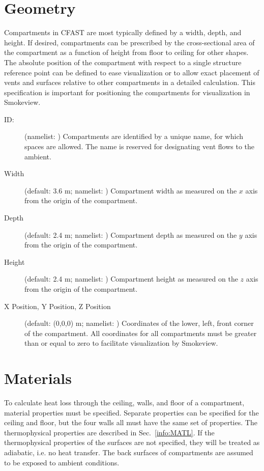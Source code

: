 \section{Geometry}
\label{info:COMP}
\label{Compartment_Geometry}

Compartments in CFAST are most typically defined by a width, depth, and height.  If desired, compartments can be prescribed by the cross-sectional area of the compartment as a function of height from floor to ceiling for other shapes. The absolute position of the compartment with respect to a single structure reference point can be defined to ease visualization or to allow exact placement of vents and surfaces relative to other compartments in a detailed calculation. This specification is important for positioning the compartments for visualization in Smokeview.
\begin{description}
\item[ ID:] (namelist: ) Compartments are identified by a unique name, for which spaces are allowed.  The name  is reserved for designating vent flows to the ambient.

\item[Width] (default: 3.6 m; namelist: ) Compartment width as measured on the $x$ axis from the origin of the compartment.

\item[Depth] (default: 2.4 m; namelist: ) Compartment depth as measured on the $y$ axis from the origin of the compartment.

\item[Height] (default: 2.4 m; namelist: )  Compartment height as measured on the $z$ axis from the origin of the compartment.

\item[X Position, Y Position, Z Position] (default: (0,0,0) m; namelist: ) Coordinates of the lower, left, front corner of the compartment. All coordinates for all compartments must be greater than or equal to zero to facilitate visualization by Smokeview.
\end{description}



\section{Materials}
\label{info:COMP2}

To calculate heat loss through the ceiling, walls, and floor of a compartment, material properties must be specified. Separate properties can be specified for the ceiling and floor, but the four walls all must have the same set of properties. The thermophysical properties are described in Sec.~\ref{info:MATL}. If the thermophysical properties of the surfaces are not specified, they will be treated as adiabatic, i.e. no heat transfer. The back surfaces of compartments are assumed to be exposed to ambient conditions.

